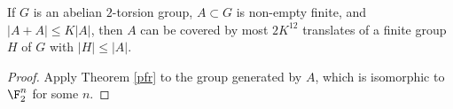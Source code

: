 \begin{corollary}\label{pfr-cor}
  \leanok
  If $G$ is an abelian $2$-torsion group, $A \subset G$ is non-empty finite, and $|A+A| \leq K|A|
  $, then $A$ can be covered by most $2K^{12}$ translates of a finite group  $H$ of $G$ with $|H| \leq |A|$.
  \end{corollary}

\begin{proof}\leanok  Apply Theorem \ref{pfr} to the group generated by $A$, which is isomorphic to $\F_2^n$ for some $n$.
\end{proof}
